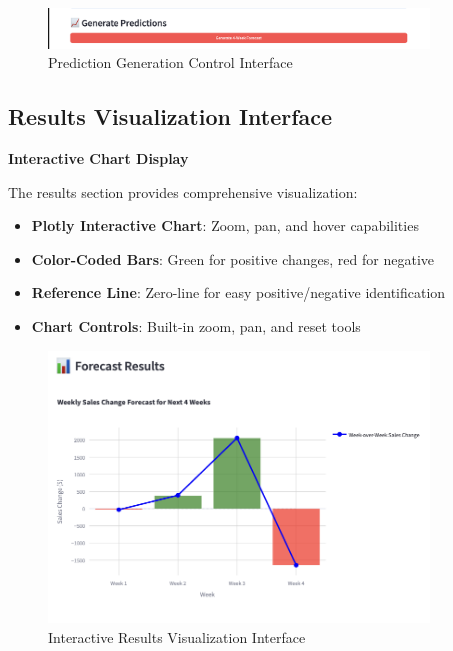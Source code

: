 \begin{figure}[H]
    \centering
    \includegraphics[width=0.9\textwidth]{Images/04GUIAndUserInterface/PredictionGeneration.png}
    \caption{Prediction Generation Control Interface}
    \label{fig:prediction_generation}
\end{figure}

\subsection{Results Visualization Interface}

\textbf{Interactive Chart Display}

The results section provides comprehensive visualization:

\begin{itemize}
    \item \textbf{Plotly Interactive Chart}: Zoom, pan, and hover capabilities
    \item \textbf{Color-Coded Bars}: Green for positive changes, red for negative
    \item \textbf{Reference Line}: Zero-line for easy positive/negative identification
    \item \textbf{Chart Controls}: Built-in zoom, pan, and reset tools
\end{itemize}

\begin{figure}[H]
    \centering
    \includegraphics[width=0.9\textwidth]{Images/04GUIAndUserInterface/ResultsVisualization.png}
    \caption{Interactive Results Visualization Interface}
    \label{fig:results_visualization}
\end{figure}

